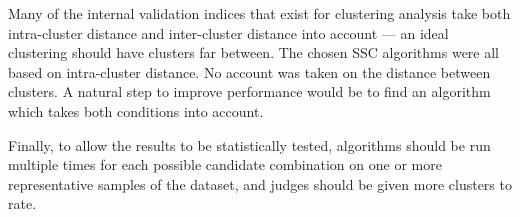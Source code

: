 \documentclass[../report.tex]{subfiles}
\begin{document}
Many of the internal validation indices that exist for clustering analysis take both intra-cluster distance and inter-cluster distance into account --- an ideal clustering should have clusters far between. The chosen SSC algorithms were all based on intra-cluster distance. No account was taken on the distance between clusters. A natural step to improve performance would be to find an algorithm which takes both conditions into account.

Finally, to allow the results to be statistically tested, algorithms should be run multiple times for each possible candidate combination on one or more representative samples of the dataset, and judges should be given more clusters to rate.
\end{document}
